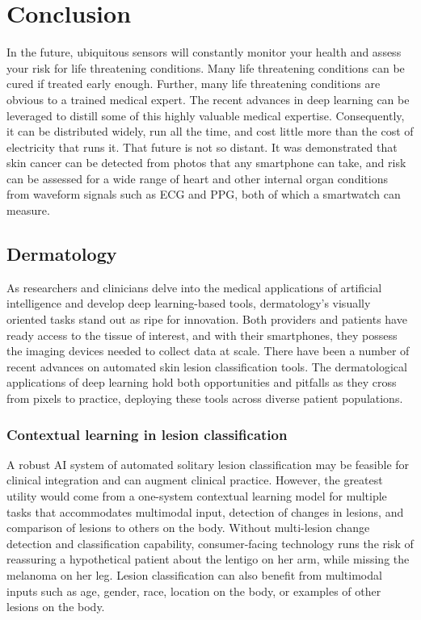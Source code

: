 \chapter{Conclusion}
In the future, ubiquitous sensors will constantly monitor your health and assess your risk for life threatening conditions.  Many life threatening conditions can be cured if treated early enough.  Further, many life threatening conditions are obvious to a trained medical expert.  The recent advances in deep learning can be leveraged to distill some of this highly valuable medical expertise.  Consequently, it can be distributed widely, run all the time, and cost little more than the cost of electricity that runs it.  That future is not so distant.  It was demonstrated that skin cancer can be detected from photos that any smartphone can take, and risk can be assessed for a wide range of heart and other internal organ conditions from waveform signals such as ECG and PPG, both of which a smartwatch can measure.

\section{Dermatology}
As researchers and clinicians delve into the medical applications of artificial intelligence and develop deep learning-based tools, dermatology's visually oriented tasks stand out as ripe for innovation. Both providers and patients have ready access to the tissue of interest, and with their smartphones, they possess the imaging devices needed to collect data at scale. There have been a number of recent advances on automated skin lesion classification tools. The dermatological applications of deep learning hold both opportunities and pitfalls as they cross from pixels to practice, deploying these tools across diverse patient populations.

\subsection{Contextual learning in lesion classification}
A robust AI system of automated solitary lesion classification may be feasible for clinical integration and can augment clinical practice. However, the greatest utility would come from a one-system contextual learning model for multiple tasks that accommodates multimodal input, detection of changes in lesions, and comparison of lesions to others on the body. Without multi-lesion change detection and classification capability, consumer-facing technology runs the risk of reassuring a hypothetical patient about the lentigo on her arm, while missing the melanoma on her leg. Lesion classification can also benefit from multimodal inputs such as age, gender, race, location on the body, or examples of other lesions on the body.

